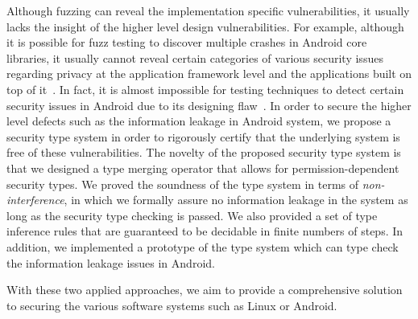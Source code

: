 Although fuzzing can reveal the implementation specific vulnerabilities, it usually lacks the insight of the higher level design vulnerabilities. For example, although it is possible for fuzz testing to discover multiple crashes in Android core libraries, it usually cannot reveal certain categories of various security issues regarding privacy at the application framework level and the applications built on top of it~\cite{Enck:2009:UAS:1512148.1512324,Ernst:2014}. In fact, it is almost impossible for testing techniques to detect certain security issues in Android due to its designing flaw~\cite{url:android-flaw}. In order to secure the higher level defects such as the information leakage in Android system, we propose a security type system in order to rigorously certify that the underlying system is free of these vulnerabilities. The novelty of the proposed security type system is that we designed a type merging operator that allows for permission-dependent security types. We proved the soundness of the type system in terms of \emph{non-interference}, in which we formally assure no information leakage in the system as long as the security type checking is passed. We also provided a set of type inference rules that are guaranteed to be decidable in finite numbers of steps. In addition, we implemented a prototype of the type system which can type check the information leakage issues in Android.

With these two applied approaches, we aim to provide a comprehensive solution to securing the various software systems such as Linux or Android.

